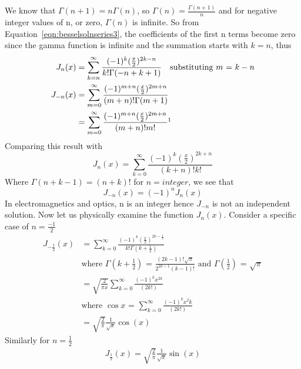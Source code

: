 We know that $\Gamma(n + 1) = n \Gamma(n)$, so 	$\Gamma(n) = \frac{\Gamma(n + 1)}{n} $ and for negative integer values of n, or zero, $\Gamma(n)$ is infinite. So from Equation~\ref{eqn:besselsolnseries3}, the coefficients of the first n terms become zero since the gamma function is infinite and the summation starts with $k=n$, thus
\begin{align*}
J_n(x) &= \sum_{k = n}^{\infty}\frac{(-1)^k (\frac{x}{2})^{2k - n}}{k! \Gamma(-n + k + 1)}\quad\text{substituting }m\text{ = }k - n\\
J_{-n}(x) &= \sum_{m = 0}^{\infty}\frac{(-1)^{m + n} (\frac{x}{2})^{2m + n}}{(m + n)! \Gamma(m + 1)}\\
&= \sum_{m = 0}^{\infty}\frac{(-1)^{m + n} (\frac{x}{2})^{2m + n}}{(m + n)! m!}\footnotemark
\end{align*}
Comparing this result with
\[
J_n(x) = \sum_{k = 0}^{\infty}\frac{(-1)^k (\frac{x}{2})^{2k + n}}{(k + n)! k!}
\]
Where $\Gamma(n + k - 1)=(n + k)!$ for $n= integer$, we see that
\begin{equation}
J_{-n}(x) = (-1)^n J_n(x)
\label{eqn:besselsolnseries4}
\end{equation}
In electromagnetics and optics, n is an integer hence $J_{-n}$ is not an independent solution. Now let us physically examine the function $J_n(x)$. Consider a specific case of $n = \frac{-1}{2}$
\begin{align*}
J_{-\frac{1}{2}}(x) &= \sum_{k = 0}^{\infty}\frac{(-1)^k (\frac{x}{2})^{2k - \frac{1}{2}}}{k! \Gamma( k + \frac{1}{2})}\\&\text{where }\Gamma\left( k + \frac{1}{2}\right)\text{ = }\frac{(2k - 1)! \sqrt{\pi}}{2^{2k - 1}(k - 1)!}\text{ and }\Gamma\left(\frac{1}{2}\right)\text{ = }\sqrt{\pi}\\
&= \sqrt{\frac{2}{\pi x}}\sum_{k = 0}^{\infty}\frac{(-1)^k x^{2k}}{(2k!)}\\&\text{where }\cos x\text{ = }\sum_{k = 0}^{\infty}\frac{(-1)^k x^2k}{(2k!)}\\
&= \sqrt{\frac{2}{\pi}}\frac{1}{\sqrt{x}}\cos(x)
\end{align*}
Similarly for $n = \frac{1}{2}$
\begin{align*}
J_{\frac{1}{2}}(x) = \sqrt{\frac{2}{\pi}}\frac{1}{\sqrt{x}}\sin(x)
\end{align*}

